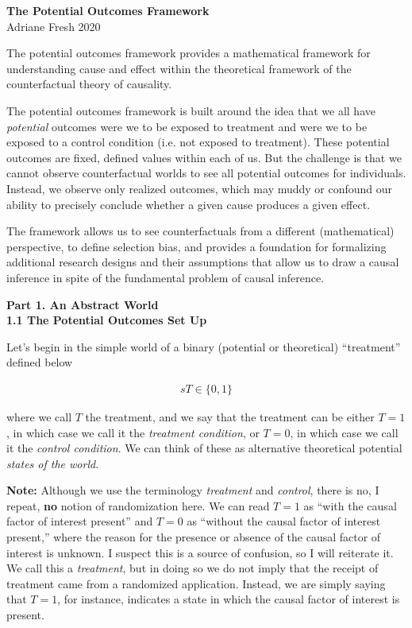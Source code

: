 \documentclass[11pt]{article}
\begin{document}
\normalsize
\singlespacing

\Large{\textbf{The Potential Outcomes Framework}}\\

\normalsize
Adriane Fresh
2020

\vspace{.2in}
The potential outcomes framework provides a mathematical framework for understanding cause and effect within the theoretical framework of the counterfactual theory of causality.

The potential outcomes framework is built around the idea that we all have \emph{potential} outcomes were we to be exposed to treatment and were we to be exposed to a control condition (i.e. not exposed to treatment).  These potential outcomes are fixed, defined values within each of us.  But the challenge is that we cannot observe counterfactual worlds to see all potential outcomes for individuals.  Instead, we observe only realized outcomes, which may muddy or confound our ability to precisely conclude whether a given cause produces a given effect.

The framework allows us to see counterfactuals from a different (mathematical) perspective, to define selection bias, and provides a foundation for formalizing additional research designs and their assumptions that allow us to draw a causal inference in spite of the fundamental problem of causal inference.

\vspace{.4in}
\large{\textbf{Part 1. An Abstract World}} \\


\large{\textbf{1.1 The Potential Outcomes Set Up}} \\

\normalsize

Let's begin in the simple world of a binary (potential or theoretical) ``treatment'' defined below

\begin{align*}s
  T \in \{0, 1\}
\end{align*}

where we call $T$ the treatment, and we say that the treatment can be either $T=1$, in which case we call it the \emph{treatment condition}, or $T=0$, in which case we call it the \emph{control condition}.  We can think of these as alternative theoretical potential \emph{states of the world}.

\textbf{Note:} Although we use the terminology \emph{treatment} and \emph{control}, there is no, I repeat, \textbf{no} notion of randomization here.  We can read $T=1$ as ``with the causal factor of interest present'' and $T=0$ as ``without the causal factor of interest present,'' where the reason for the presence or absence of the causal factor of interest is unknown.   I suspect this is a source of confusion, so I will reiterate it.  We call this a \emph{treatment}, but in doing so we do not imply that the receipt of treatment came from a randomized application.  Instead, we are simply saying that $T=1$, for instance, indicates a state in which the causal factor of interest is present.
\end{document}
